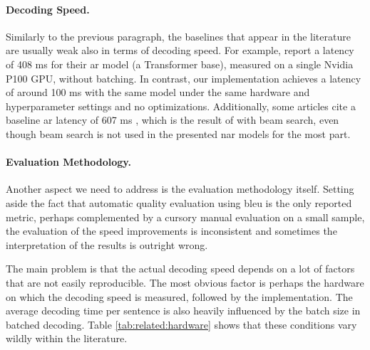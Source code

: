 \paragraph{Decoding Speed.} Similarly to the previous paragraph, the baselines
that appear in the literature are usually weak also in terms of decoding speed.
For example, \citet{gu2017nonautoregressive} report a latency of 408 ms for
their \ac{ar} model (a Transformer base), measured on a single Nvidia P100 GPU,
without batching. In contrast, our implementation achieves a latency of around
100 ms with the same model under the same hardware and hyperparameter settings
and no optimizations. Additionally, some articles cite a baseline \ac{ar}
latency of 607 ms \citep{wang-etal-2019-nonautoregressive,
  guo-etal-2020-jointly}, which is the result of
\citet{gu2017nonautoregressive} with beam search, even though beam search is
not used in the presented \ac{nar} models for the most part.

\paragraph{Evaluation Methodology.} Another aspect we need to address is the
evaluation methodology itself. Setting aside the fact that automatic quality
evaluation using \acs{bleu} is the only reported metric, perhaps complemented
by a cursory manual evaluation on a small sample, the evaluation of the speed
improvements is inconsistent and sometimes the interpretation of the results is
outright wrong.

The main problem is that the actual decoding speed depends on a lot of factors
that are not easily reproducible. The most obvious factor is perhaps the
hardware on which the decoding speed is measured, followed by the
implementation. The average decoding time per sentence is also heavily
influenced by the batch size in batched decoding. Table
\ref{tab:related:hardware} shows that these conditions vary wildly within the
literature.

